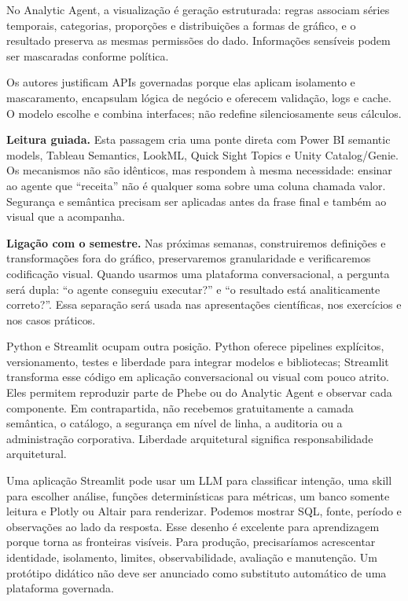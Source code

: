 \begin{ArticleBox}
No Analytic Agent, a visualização é geração estruturada: regras associam séries temporais, categorias, proporções e distribuições a formas de gráfico, e o resultado preserva as mesmas permissões do dado. Informações sensíveis podem ser mascaradas conforme política.

Os autores justificam APIs governadas porque elas aplicam isolamento e mascaramento, encapsulam lógica de negócio e oferecem validação, logs e cache. O modelo escolhe e combina interfaces; não redefine silenciosamente seus cálculos.
\end{ArticleBox}

\noindent\textbf{Leitura guiada.} Esta passagem cria uma ponte direta com Power BI semantic models, Tableau Semantics, LookML, Quick Sight Topics e Unity Catalog/Genie. Os mecanismos não são idênticos, mas respondem à mesma necessidade: ensinar ao agente que ``receita'' não é qualquer soma sobre uma coluna chamada valor. Segurança e semântica precisam ser aplicadas antes da frase final e também ao visual que a acompanha.

\noindent\textbf{Ligação com o semestre.} Nas próximas semanas, construiremos definições e transformações fora do gráfico, preservaremos granularidade e verificaremos codificação visual. Quando usarmos uma plataforma conversacional, a pergunta será dupla: ``o agente conseguiu executar?'' e ``o resultado está analiticamente correto?''. Essa separação será usada nas apresentações científicas, nos exercícios e nos casos práticos.

Python e Streamlit ocupam outra posição. Python oferece pipelines explícitos, versionamento, testes e liberdade para integrar modelos e bibliotecas; Streamlit transforma esse código em aplicação conversacional ou visual com pouco atrito. Eles permitem reproduzir parte de Phebe ou do Analytic Agent e observar cada componente. Em contrapartida, não recebemos gratuitamente a camada semântica, o catálogo, a segurança em nível de linha, a auditoria ou a administração corporativa. Liberdade arquitetural significa responsabilidade arquitetural.

Uma aplicação Streamlit pode usar um LLM para classificar intenção, uma skill para escolher análise, funções determinísticas para métricas, um banco somente leitura e Plotly ou Altair para renderizar. Podemos mostrar SQL, fonte, período e observações ao lado da resposta. Esse desenho é excelente para aprendizagem porque torna as fronteiras visíveis. Para produção, precisaríamos acrescentar identidade, isolamento, limites, observabilidade, avaliação e manutenção. Um protótipo didático não deve ser anunciado como substituto automático de uma plataforma governada.


